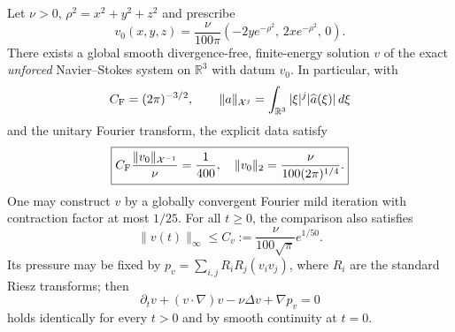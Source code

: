 \begin{theorem}
\label{thm:xxxiv-gaussian}
Let $\nu>0$, $\rho^2=x^2+y^2+z^2$ and prescribe
\begin{equation}\label{eq:xxxiv-datum}
\boxed{
v_0(x,y,z)=\frac{\nu}{100\pi}
(-2y e^{-\rho^2},\,2x e^{-\rho^2},\,0).
}
\end{equation}
There exists a global smooth divergence-free, finite-energy
solution $v$ of the exact \emph{unforced} Navier--Stokes system
on $\mathbb R^3$ with datum $v_0$. In particular, with
\[
C_{\rm F}=(2\pi)^{-3/2},\qquad
\|a\|_{\mathcal X^j}=\int_{\mathbb R^3}
|\xi|^j|\widehat a(\xi)|\,d\xi
\]
and the unitary Fourier transform, the explicit data satisfy
\[
\boxed{
C_{\rm F}\frac{\|v_0\|_{\mathcal X^{-1}}}{\nu}
=\frac1{400},\quad
\|v_0\|_2=\frac{\nu}{100(2\pi)^{1/4}}.
}
\]
One may construct $v$ by a globally convergent Fourier mild
iteration with contraction factor at most $1/25$.
For all $t\ge0$, the comparison also satisfies
\begin{equation}\label{eq:xxxiv-uniform-bound}
\boxed{\quad
\|v(t)\|_\infty\le
C_v:=\frac{\nu}{100\sqrt\pi}e^{1/50}.\quad}
\end{equation}
Its pressure may be fixed by
$p_v=\sum_{i,j}R_iR_j(v_iv_j)$, where $R_i$ are the
standard Riesz transforms; then
\[
\partial_tv+(v\cdot\nabla)v-\nu\Delta v+\nabla p_v=0
\]
holds identically for every $t>0$ and by smooth continuity
at $t=0$.
\end{theorem}
